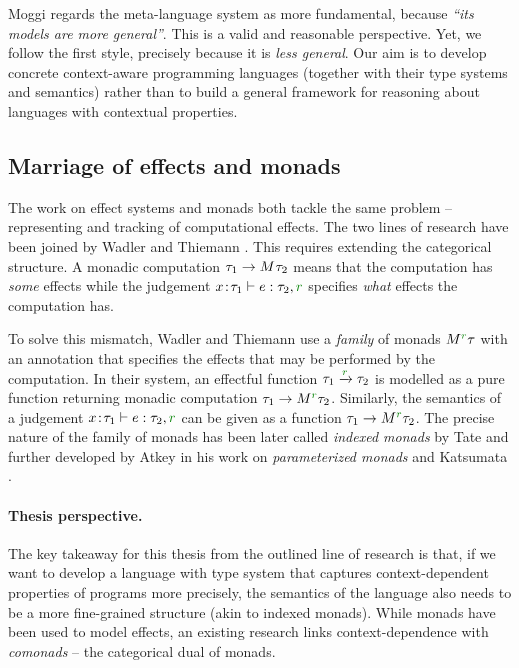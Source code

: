 Moggi regards the meta-language system as more fundamental, because \emph{``its models are more
general''}. This is a valid and reasonable perspective. Yet, we follow the first style,
precisely because it is \emph{less general}. Our aim is to develop concrete context-aware
programming languages (together with their type systems and semantics) rather than to build a
general framework for reasoning about languages with contextual properties.


\subsection{Marriage of effects and monads}
\label{sec:path-sem-effects}

The work on effect systems and monads both tackle the same problem -- representing and tracking of
computational effects. The two lines of research have been joined by Wadler and Thiemann
\cite{monads-effects-marriage}. This requires extending the categorical structure. A monadic
computation $\tau_1 \rightarrow M^{}\tau_2$ means that the computation has \emph{some}
effects while the judgement $x\!:\!\tau_1 \vdash e : \tau_2, \cclrd{r}$ specifies \emph{what} effects
the computation has.

To solve this mismatch, Wadler and Thiemann use a \emph{family} of monads $\mtyp{\cclrd{r}}{\tau}$
with an annotation that specifies the effects that may be performed by the computation. In their
system, an effectful function $\tau_1 \xrightarrow{\cclrd{r}} \tau_2$ is modelled as a pure
function returning monadic computation $\tau_1 \rightarrow \mtyp{\cclrd{r}}{\tau_2}$. Similarly, the
semantics of a judgement $x\!:\!\tau_1 \vdash e : \tau_2, \cclrd{r}$ can be given as a function
$\tau_1 \rightarrow \mtyp{\cclrd{r}}{\tau_2}$.
The precise nature of the family of monads has been later called \emph{indexed monads} by Tate
\cite{effects-producer-semantics} and further developed by Atkey \cite{monads-parameterised-notions}
in his work on \emph{parameterized monads} and Katsumata \cite{monads-parametric}.

\paragraph{Thesis perspective.}
The key takeaway for this thesis from the outlined line of research is that, if we want to develop a
language with type system that captures context-dependent properties of programs more precisely,
the semantics of the language also needs to be a more fine-grained structure (akin to indexed
monads). While monads have been used to model effects, an existing research links context-dependence
with \emph{comonads} -- the categorical dual of monads.

